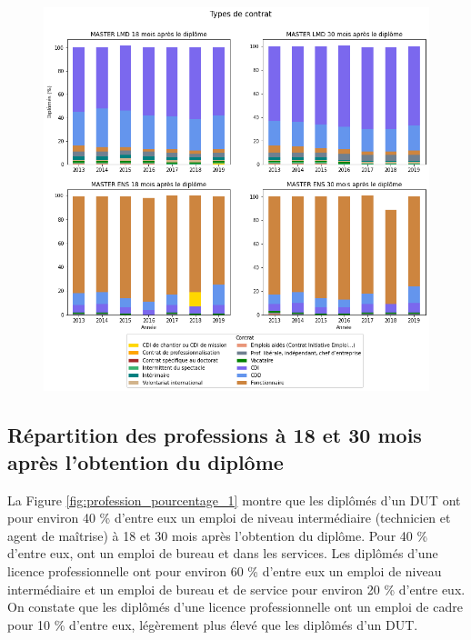 \documentclass[12pt, a4paper, titlepage, table]{article}
\begin{document}
		\begin{figure}[H]
			\centering
			\includegraphics[width=1\textwidth]{../graphs/repartition_contrats_situation_2.png}
			\label{fig:contrat_pourcentage_2}
		\end{figure}

	\subsection{Répartition des professions à 18 et 30 mois après l'obtention du diplôme}
	La Figure \ref{fig:profession_pourcentage_1} montre que les diplômés d'un DUT ont pour environ 40 \% d'entre eux un emploi de niveau intermédiaire (technicien et agent de maîtrise) à 18 et 30 mois après l'obtention du diplôme. Pour 40 \% d'entre eux, ont un emploi de bureau et dans les services.
	Les diplômés d'une licence professionnelle ont pour environ 60 \% d'entre eux un emploi de niveau intermédiaire et un emploi de bureau et de service pour environ 20 \% d'entre eux.
	On constate que les diplômés d'une licence professionnelle ont un emploi de cadre pour 10 \% d'entre eux, légèrement plus élevé que les diplômés d'un DUT.
	
\end{document}
